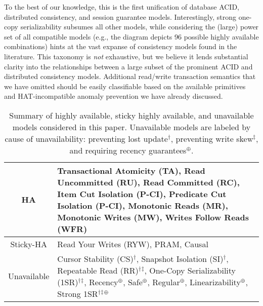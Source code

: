 To the best of our knowledge, this is the first unification of
database ACID, distributed consistency, and session guarantee
models. Interestingly, strong one-copy serializability subsumes all
other models, while considering the (large) power set of all
compatible models (e.g., the diagram depicts 96 possible highly
available combinations) hints at the vast expanse of consistency
models found in the literature. This taxonomy  is \textit{not}
exhaustive, but we believe it lends substantial clarity into the
relationships between a large subset of the prominent ACID and
distributed consistency models. Additional read/write transaction
semantics that we have omitted should be easily classifiable based on
the available primitives and HAT-incompatible anomaly prevention we
have already discussed.

 \newcommand{\lostupdate}{$^\dagger$}
 \newcommand{\rwskew}{$^\ddagger$}
 \newcommand{\linearizable}{$^\oplus$}

\begin{table}[t!]
\begin{tabular}{| c | p{6cm} | }\hline
HA & Transactional Atomicity (TA), Read Uncommitted (RU), Read
Committed (RC), Item Cut Isolation (P-CI), Predicate Cut Isolation
(P-CI), Monotonic Reads (MR), Monotonic Writes (MW), Writes Follow
Reads (WFR)\\\hline Sticky-HA & Read Your Writes (RYW), PRAM,
Causal\\\hline Unavailable & Cursor Stability (CS)\lostupdate,
Snapshot Isolation (SI)\lostupdate, Repeatable Read
(RR)\lostupdate\rwskew, One-Copy Serializability
(1SR)\lostupdate\rwskew, Recency\linearizable, Safe\linearizable,
Regular\linearizable, Linearizability\linearizable, Strong
1SR\lostupdate\rwskew\linearizable \\\hline
\end{tabular}
\caption{Summary of highly available, sticky highly available, and
  unavailable models considered in this paper. Unavailable models are
  labeled by cause of unavailability: preventing lost
  update\lostupdate, preventing write skew\rwskew, and requiring
  recency guarantees\linearizable.}
\label{table:hatcompared}
\end{table}

